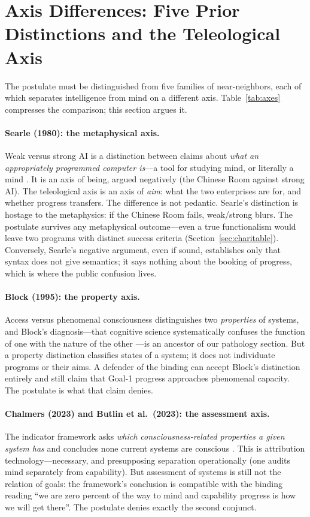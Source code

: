 \documentclass[10pt]{article}
\begin{document}
\section{Axis Differences: Five Prior Distinctions and the Teleological Axis}\label{sec:axes}

The postulate must be distinguished from five families of near-neighbors, each of which separates intelligence from mind on a different axis. Table~\ref{tab:axes} compresses the comparison; this section argues it.

\paragraph{Searle (1980): the metaphysical axis.} Weak versus strong AI is a distinction between claims about \emph{what an appropriately programmed computer is}---a tool for studying mind, or literally a mind \cite{searle1980}. It is an axis of being, argued negatively (the Chinese Room against strong AI). The teleological axis is an axis of \emph{aim}: what the two enterprises are for, and whether progress transfers. The difference is not pedantic. Searle's distinction is hostage to the metaphysics: if the Chinese Room fails, weak/strong blurs. The postulate survives any metaphysical outcome---even a true functionalism would leave two programs with distinct success criteria (Section~\ref{sec:charitable}). Conversely, Searle's negative argument, even if sound, establishes only that syntax does not give semantics; it says nothing about the booking of progress, which is where the public confusion lives.

\paragraph{Block (1995): the property axis.} Access versus phenomenal consciousness distinguishes two \emph{properties} of systems, and Block's diagnosis---that cognitive science systematically confuses the function of one with the nature of the other \cite{block1995}---is an ancestor of our pathology section. But a property distinction classifies states of a system; it does not individuate programs or their aims. A defender of the binding can accept Block's distinction entirely and still claim that Goal-1 progress approaches phenomenal capacity. The postulate is what that claim denies.

\paragraph{Chalmers (2023) and Butlin et al.\ (2023): the assessment axis.} The indicator framework asks \emph{which consciousness-related properties a given system has} and concludes none current systems are conscious \cite{chalmers2023llm,butlin2023consciousness}. This is attribution technology---necessary, and presupposing separation operationally (one audits mind separately from capability). But assessment of systems is still not the relation of goals: the framework's conclusion is compatible with the binding reading ``we are zero percent of the way to mind and capability progress is how we will get there''. The postulate denies exactly the second conjunct.
\end{document}
